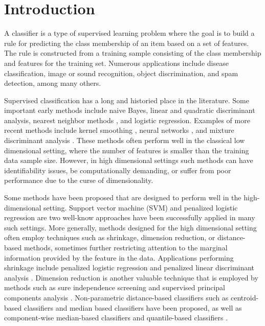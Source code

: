 
\section{Introduction}
\label{sec:intro}

A classifier is a type of supervised learning problem where the goal is to build
a rule for predicting the class membership of an item based on a set of
features.  The rule is constructed from a training sample consisting of the
class membership and features for the training set.  Numerous applications
include disease classification, image or sound recognition, object
discrimination, and spam detection, among many others.

Supervised classification has a long and historied place in the literature.
Some important early methods include naive Bayes, linear and quadratic
discriminant analysis, nearest neighbor methods \cite{cover1967}, and logistic
regression.  Examples of more recent methods include kernel smoothing
\cite{mika1999}, neural networks \cite{ripley1994}, and mixture discriminant
analysis \cite{hastie1996}.  These methods often perform well in the classical
low dimensional setting, where the number of features is smaller than the
training data sample size.  However, in high dimensional settings such methods
can have identifiability issues, be computationally demanding, or suffer from
poor performance due to the curse of dimensionality.

Some methods have been proposed that are designed to perform well in the
high-dimensional setting.  Support vector machine (SVM) \cite{cortes1995} and
penalized logistic regression \cite{park2007} are two well-know approaches have
been successfully applied in many such settings.  More generally, methods
designed for the high dimensional setting often employ techniques such as
shrinkage, dimension reduction, or distance-based methods, sometimes further
restricting attention to the marginal information provided by the feature in the
data.  Applications performing shrinkage include penalized logistic regression
and penalized linear discriminant analysis \cite{tibshirani2002, clemmensen2011,
  witten2011}.  Dimension reduction is another valuable technique that is
employed by methods such as sure independence screening \cite{fan2008} and
supervised principal components analysis \cite{bair2006}.  Non-parametric
distance-based classifiers such as centroid-based classifiers
\cite{tibshirani2002} and median based classifiers \cite{jornsten2004,
  ghosh2005} have been proposed, as well as component-wise median-based
classifiers \cite{hall2012} and quantile-based classifiers \cite{hennig2016}.

